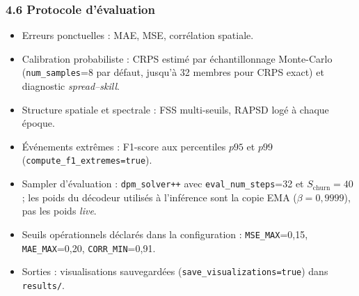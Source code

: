 \documentclass[12pt,a4paper]{article}
\begin{document}
\subsubsection*{4.6 Protocole d'\'evaluation}
\begin{itemize}
    \item Erreurs ponctuelles : MAE, MSE, corr\'elation spatiale.
    \item Calibration probabiliste : CRPS estim\'e par \'echantillonnage Monte-Carlo (\texttt{num\_samples}=8 par d\'efaut, jusqu'\`a 32 membres pour CRPS exact) et diagnostic \emph{spread--skill}.
    \item Structure spatiale et spectrale : FSS multi-seuils, RAPSD log\'e \`a chaque \'epoque.
    \item \'Ev\'enements extr\^emes : F1-score aux percentiles $p95$ et $p99$ (\texttt{compute\_f1\_extremes=true}).
    \item Sampler d'\'evaluation : \texttt{dpm\_solver++} avec \texttt{eval\_num\_steps}=32 et $S_{\text{churn}}=40$ ; les poids du d\'ecodeur utilis\'es \`a l'inf\'erence sont la copie EMA ($\beta=0{,}9999$), pas les poids \emph{live}.
    \item Seuils op\'erationnels d\'eclar\'es dans la configuration : \texttt{MSE\_MAX}=0{,}15, \texttt{MAE\_MAX}=0{,}20, \texttt{CORR\_MIN}=0{,}91.
    \item Sorties : visualisations sauvegard\'ees (\texttt{save\_visualizations=true}) dans \texttt{results/}.
\end{itemize}
\end{document}

